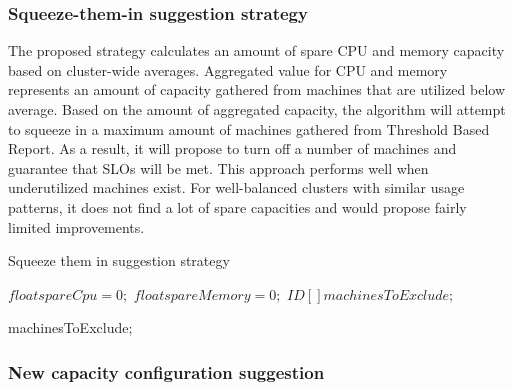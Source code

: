 \documentclass[]{final_report}
\begin{document}
\subsubsection{Squeeze-them-in suggestion strategy}

The proposed strategy calculates an amount of spare CPU and memory capacity based on cluster-wide averages. Aggregated value for CPU and memory represents an amount of capacity gathered from machines that are utilized below average. Based on the amount of aggregated capacity, the algorithm will attempt to squeeze in a maximum amount of machines gathered from Threshold Based Report. As a result, it will propose to turn off a number of machines and guarantee that SLOs will be met.
This approach performs well when underutilized machines exist. For well-balanced clusters with similar usage patterns, it does not find a lot of spare capacities and would propose fairly limited improvements. 

\begin{algorithm}[h]
\caption{Squeeze them in suggestion strategy}
\label{alg:squeeze-them-in}
 \algrenewcommand{}
 \algrenewcommand{}

  $float spareCpu = 0;$
  $float spareMemory = 0;$
  $ID[ ] machinesToExclude;$



\Return machinesToExclude;

\end{algorithm}

\subsubsection{New capacity configuration suggestion}
\end{document}
